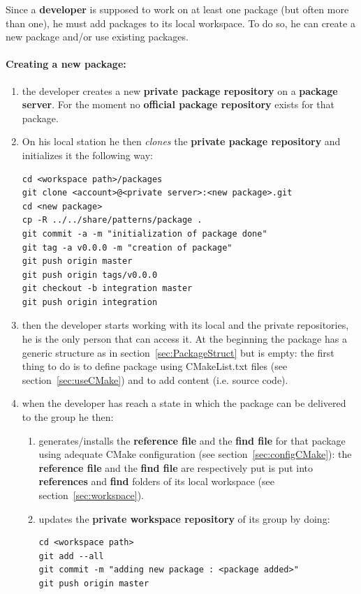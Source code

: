 \documentclass[12pt,a4paper]{article}
\begin{document}
Since a \textbf{developer} is supposed to work on at least one package (but often more than one), he must add packages to its local workspace. To do so, he can create a new package and/or use existing packages.

\paragraph{Creating a new package:}
\begin{enumerate}
\item the developer creates a new \textbf{private package repository} on a \textbf{package server}. For the moment no \textbf{official package repository} exists for that package.
\item On his local station he then \textit{clones} the \textbf{private package repository} and initializes it the following way:
\begin{verbatim}
cd <workspace path>/packages
git clone <account>@<private server>:<new package>.git
cd <new package>
cp -R ../../share/patterns/package .
git commit -a -m "initialization of package done"
git tag -a v0.0.0 -m "creation of package"
git push origin master
git push origin tags/v0.0.0
git checkout -b integration master
git push origin integration
\end{verbatim}
\item then the developer starts working with its local and the private repositories, he is the only person that can access it. At the beginning the package has a generic structure as in section~\ref{sec:PackageStruct} but is empty: the first thing to do is to define package using CMakeList.txt files (see section~\ref{sec:useCMake}) and to add content (i.e. source code).
\item when the developer has reach a state in which the package can be delivered to the group he then:
\begin{enumerate}
\item generates/installs the \textbf{reference file} and the \textbf{find file} for that package using adequate CMake configuration (see section~\ref{sec:configCMake}): the \textbf{reference file} and the \textbf{find file} are respectively put is put into \textbf{references} and \textbf{find} folders of its local workspace (see section~\ref{sec:workspace}).
\item updates the \textbf{private workspace repository} of its group by doing:
\begin{verbatim}
cd <workspace path>
git add --all
git commit -m "adding new package : <package added>"
git push origin master
\end{verbatim}
\end{enumerate}
\end{enumerate}
\end{document}
